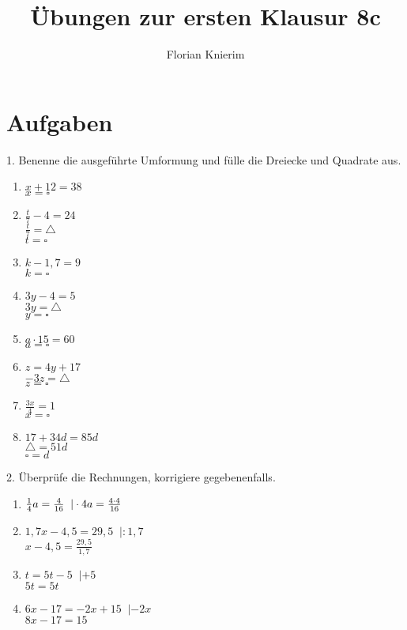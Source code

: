 \documentclass[11pt,a4paper]{scrartcl}
\begin{document}
\pagestyle{fancy}
\title{Übungen zur ersten Klausur 8c}
\author{Florian Knierim}


\rhead{\footnotesize
	}
\section*{Aufgaben}\vspace{-1em}
1. Benenne die ausgeführte Umformung und fülle die Dreiecke und Quadrate aus.
\begin{multicols}{4}
	\begin{enumerate}[label=\alph*)] 
		\item $x+12 = 38 $\\ 		$x = \square $
		\item $\frac{t}{7}-4 = 24$\\ $\frac{t}{7} = \triangle$\\ $t = \square$
		\item $k-1,7 = 9$\\ 		$k = \square $
		\item $3y -4 = 5$\\ $3y = \triangle $\\ $y = \square$
		\item $a\cdot 15 = 60 $\\	$a = \square $
		\item $z= 4y+17$\\$-3z=\triangle$\\$z = \square$
		\item $\frac{3x}{4} = 1$\\	$x= \square $
		\item $17+34d = 85d$\\ $\triangle = 51d$\\ $\square = d$
	\end{enumerate}
\end{multicols}

2. Überprüfe die Rechnungen, korrigiere gegebenenfalls.
\begin{multicols}{2}
	\begin{enumerate}[label=\alph*)] 
		\item $\frac{1}{4}a = \frac{4}{16} \;\;|\cdot 4\\ a = \frac{4\cdot4}{16}$
		\item $1,7x -4,5 = 29,5 \;\;|:1,7$\\ $x-4,5 = \frac{29,5}{1,7}$
		\item $ t = 5t -5 \;\;|+5$\\ $5t = 5t$
		\item $6x-17 = -2x+15\;\;|-2x$\\ $8x -17 = 15$
	\end{enumerate}
\end{multicols}
\end{document}
